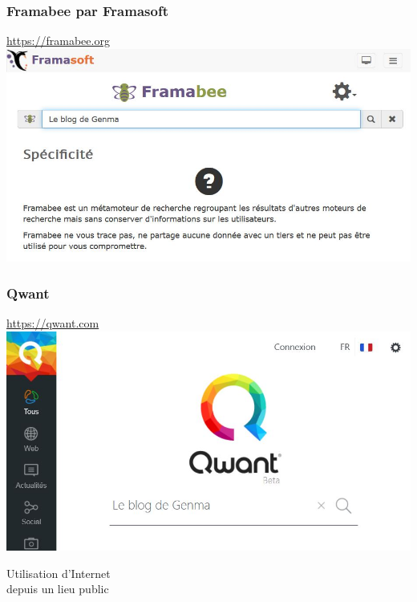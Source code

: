\documentclass{beamer}
\begin{document}
\begin{frame}
\begin{center}
\frametitle{Framabee par Framasoft}

\url{https://framabee.org}
\\
\includegraphics[scale=0.6] {./images/Framabee.jpg}
\end{center}
\end{frame}

\begin{frame}
\begin{center}
\frametitle{Qwant}

\url{https://qwant.com}
\\
\includegraphics[scale=0.6] {./images/Qwant.jpg}
\end{center}
\end{frame}

\begin{frame}
\begin{center}
\Huge{Utilisation d'Internet \\depuis un lieu public}
\end{center}
\end{frame}
\end{document}
